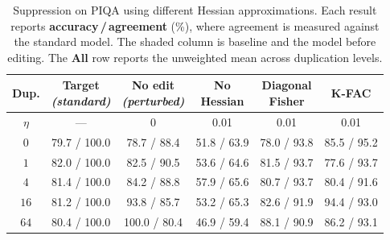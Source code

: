 \begin{table}[h]
    \centering
    \small
    \setlength{\tabcolsep}{5pt}
    \renewcommand{\arraystretch}{1.12}
    \caption{
        Suppression on PIQA using different Hessian approximations. Each result reports \textbf{accuracy\,/\,agreement} (\%), where agreement is measured against the standard model. The shaded column is baseline and the model before editing. The \textbf{All} row reports the unweighted mean across duplication levels.
    }
    \begin{tabular}{@{}c c c c c c@{}}
        \toprule
        \textbf{Dup.}
        & \shortstack{\textbf{Target}\\\textit{(standard)}}
        & \cellcolor{gray!18}
          \shortstack{\textbf{No edit}\\\textit{(perturbed)}}
        & \shortstack{\textbf{No}\\\textbf{Hessian}}
        & \shortstack{\textbf{Diagonal}\\\textbf{Fisher}}
        & \textbf{K-FAC} \\
        \midrule

        $\eta$
        & ---
        & \cellcolor{gray!18} 0
        & 0.01
        & 0.01
        & 0.01 \\

        \midrule

        $0$
        & 79.7 / 100.0
        & \cellcolor{gray!18} 78.7 / 88.4
        & 51.8 / 63.9
        & 78.0 / 93.8
        & 85.5 / 95.2 \\

        $1$
        & 82.0 / 100.0
        & \cellcolor{gray!18} 82.5 / 90.5
        & 53.6 / 64.6
        & 81.5 / 93.7
        & 77.6 / 93.7 \\

        $4$
        & 81.4 / 100.0
        & \cellcolor{gray!18} 84.2 / 88.8
        & 57.9 / 65.6
        & 80.7 / 93.7
        & 80.4 / 91.6 \\

        $16$
        & 81.2 / 100.0
        & \cellcolor{gray!18} 93.8 / 85.7
        & 53.2 / 65.3
        & 82.6 / 91.9
        & 94.4 / 93.0 \\

        $64$
        & 80.4 / 100.0
        & \cellcolor{gray!18} 100.0 / 80.4
        & 46.9 / 59.4
        & 88.1 / 90.9
        & 86.2 / 93.1 \\


\end{tabular}
\end{table}
